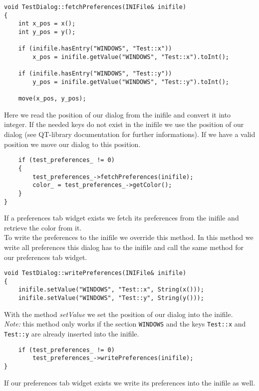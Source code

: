 \begin{verbatim}
void TestDialog::fetchPreferences(INIFile& inifile)
{
	int x_pos = x();
	int y_pos = y();

	if (inifile.hasEntry("WINDOWS", "Test::x"))
		x_pos = inifile.getValue("WINDOWS", "Test::x").toInt();

	if (inifile.hasEntry("WINDOWS", "Test::y"))
		y_pos = inifile.getValue("WINDOWS", "Test::y").toInt();

	move(x_pos, y_pos);
\end{verbatim}

Here we read the position of our dialog from the inifile and convert it into
integer. If the needed keys do not exist in the inifile we use the position
of our dialog (see QT-library documentation for further informations). If
we have a valid position we move our dialog to this position.

\begin{verbatim}
	if (test_preferences_ != 0)
	{
		test_preferences_->fetchPreferences(inifile);
		color_ = test_preferences_->getColor();
	}
}
\end{verbatim}

If a preferences tab widget exists we fetch its preferences from the inifile and
retrieve the color from it.\\

To write the preferences to the inifile we override this method. In this method we
write all preferences this dialog has to the inifile and call the same method
for our preferences tab widget.

\begin{verbatim}
void TestDialog::writePreferences(INIFile& inifile)
{
	inifile.setValue("WINDOWS", "Test::x", String(x()));
	inifile.setValue("WINDOWS", "Test::y", String(y()));
\end{verbatim}

With the method {\em setValue} we set the position of our dialog into the inifile.\\
{\em Note:} this method only works if the section {\tt WINDOWS} and the keys
{\tt Test::x} and {\tt Test::y} are already inserted into the inifile.

\begin{verbatim}
	if (test_preferences_ != 0)
		test_preferences_->writePreferences(inifile);
}
\end{verbatim}

If our preferences tab widget exists we write its preferences into the inifile as well.\\

